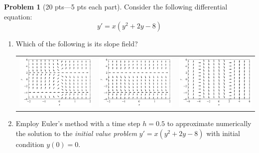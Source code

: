 \documentclass[12pt]{article}
\theoremstyle{definition}
\newtheorem{problem}{Problem}
\begin{document}
\bigskip
\begin{problem}[20 pts---5 pts each part]
Consider the following differential equation: 
\begin{equation*}
y' = x(y^2+2y-8)
\end{equation*}
\begin{enumerate}
  \item Which of the following is its slope field?
  \begin{flushright}
  \begin{tabular}{ccc}
  \includegraphics[width=0.33\linewidth]{fquiver1.png} &
  \includegraphics[width=0.33\linewidth]{fquiver2.png} &
  \includegraphics[width=0.33\linewidth]{fquiver3.png}
  \end{tabular}
  \end{flushright}
  \item Employ Euler's method with a time step $h=0.5$ to approximate numerically the solution to the \emph{initial value problem} $y'=x(y^2+2y-8)$ with initial condition $y(0)=0$.
  \begin{flushright}
\end{flushright}
\end{enumerate}
\end{problem}
\end{document}
